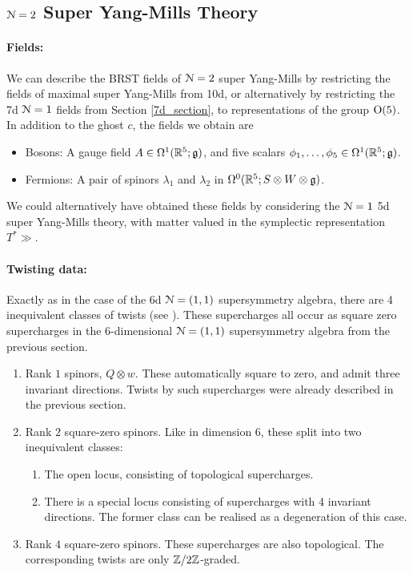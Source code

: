 \documentclass[10pt, oneside]{article}
\begin{document}
\subsection{$\mathcal{N} = 2$ Super Yang-Mills Theory} \label{5d_2_section}

\paragraph{Fields:} We can describe the BRST fields of $\mathcal{N}=2$ super Yang-Mills by restricting the fields of maximal super Yang-Mills from 10d, or alternatively by restricting the 7d $\mathcal{N}=1$ fields from Section \ref{7d_section}, to representations of the group $\mathrm{O}(5)$.  In addition to the ghost $c$, the fields we obtain are
\begin{itemize}
 \item Bosons: A gauge field $A \in \Omega^1(\mathbb R^5; \mathfrak{g})$, and five scalars $\phi_1 ,\ldots, \phi_5 \in \Omega^1(\mathbb R^5; \mathfrak{g})$.
 \item Fermions: A pair of spinors $\lambda_1$ and $\lambda_2$ in $\Omega^0(\mathbb R^5; S \otimes W \otimes \mathfrak{g})$.
\end{itemize}
We could alternatively have obtained these fields by considering the $\mathcal{N}=1$ 5d super Yang-Mills theory, with matter valued in the symplectic representation $T^*\gg$.

\vspace{-10pt}
\paragraph{Twisting data:}
Exactly as in the case of the 6d $\mathcal{N}=(1,1)$ supersymmetry algebra, there are 4 inequivalent classes of twists (see \cite[Section 4.5]{ElliottSafronov}).  These supercharges all occur as square zero supercharges in the 6-dimensional $\mathcal{N}=(1,1)$ supersymmetry algebra from the previous section.
\begin{enumerate}
 \item Rank $1$ spinors, $Q \otimes w$.  These automatically square to zero, and admit three invariant directions.  Twists by such supercharges were already described in the previous section.
 \item Rank $2$ square-zero spinors.  Like in dimension 6, these split into two inequivalent classes:
 \begin{enumerate}
 \item The open locus, consisting of topological supercharges.
 \item There is a special locus consisting of supercharges with 4 invariant directions.  The former class can be realised as a degeneration of this case.
 \end{enumerate}
 \item Rank $4$ square-zero spinors.  These supercharges are also topological.  The corresponding twists are only $\mathbb Z/2\mathbb Z$-graded.
\end{enumerate}
\end{document}
